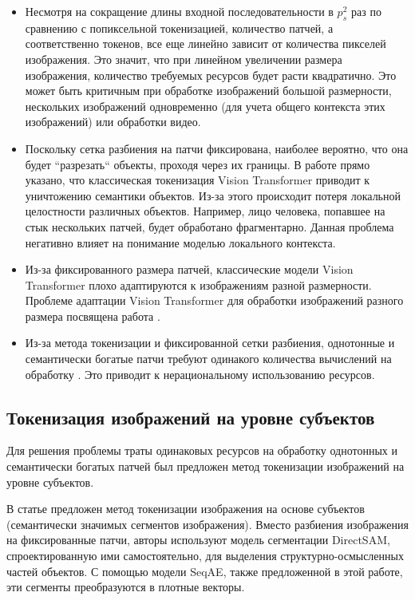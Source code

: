 \begin{itemize}
    \item Несмотря на сокращение длины входной последовательности в $p_s^2$ раз по сравнению с попиксельной токенизацией, количество патчей, а соответственно токенов, все еще линейно зависит от количества пикселей изображения. Это значит, что при линейном увеличении размера изображения, количество требуемых ресурсов будет расти квадратично. Это может быть критичным при обработке изображений большой размерности, нескольких изображений одновременно (для учета общего контекста этих изображений) или обработки видео.

    \item Поскольку сетка разбиения на патчи фиксирована, наиболее вероятно, что она будет ``разрезать`` объекты, проходя через их границы. В работе \cite{vit_patch_lack} прямо указано, что классическая токенизация Vision Transformer приводит к уничтожению семантики объектов. Из-за этого происходит потеря локальной целостности различных объектов. Например, лицо человека, попавшее на стык нескольких патчей, будет обработано фрагментарно. Данная проблема негативно влияет на понимание моделью локального контекста.
    
    \item Из-за фиксированного размера патчей, классические модели Vision Transformer плохо адаптируются к изображениям разной размерности. Проблеме адаптации Vision Transformer для обработки изображений разного размера посвящена работа \cite{vitar}.   

    \item Из-за метода токенизации и фиксированной сетки разбиения, однотонные и семантически богатые патчи требуют одинакого количества вычислений на обработку \cite{vit_patch_slimming}. Это приводит к нерациональному использованию ресурсов.
\end{itemize}

\subsection{Токенизация изображений на уровне субъектов}

Для решения проблемы траты одинаковых ресурсов на обработку однотонных и семантически богатых патчей был предложен метод токенизации изображений на уровне субъектов. 

В статье \cite{subobject_tokenization} предложен метод токенизации изображения на основе субъектов (семантически значимых сегментов изображения). Вместо разбиения изображения на фиксированные патчи, авторы используют модель сегментации DirectSAM, спроектированную ими самостоятельно, для выделения структурно-осмысленных частей объектов. С помощью модели SeqAE, также предложенной в этой работе, эти сегменты преобразуются в плотные векторы.

